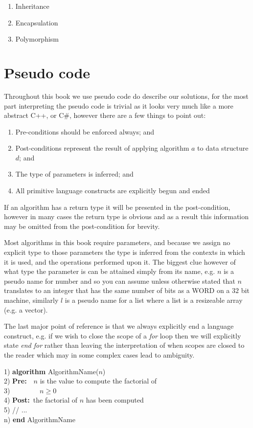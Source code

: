 \begin{enumerate}
\item Inheritance
\item Encapsulation
\item Polymorphism
\end{enumerate}

\section{Pseudo code}
Throughout this book we use pseudo code do describe our solutions, for the most part interpreting the pseudo code is trivial as it looks very much like a more abstract C++, or C\#, however there are a few things to point out:

\begin{enumerate}
\item Pre-conditions should be enforced always; and
\item Post-conditions represent the result of applying algorithm $a$ to data structure $d$; and
\item The type of parameters is inferred; and
\item All primitive language constructs are explicitly begun and ended
\end{enumerate}

If an algorithm has a return type it will be presented in the post-condition, however in many cases the return type is obvious and as a result this information may be omitted from the post-condition for brevity.

Most algorithms in this book require parameters, and because we assign no explicit type to those parameters the type is inferred from the contexts in which it is used, and the operations performed upon it. The biggest clue however of what type the parameter is can be attained simply from its name, e.g. $n$ is a pseudo name for number and so you can assume unless otherwise stated that $n$ translates to an integer that has the same number of bits as a WORD on a $32$ bit machine, similarly $l$ is a pseudo name for a list where a list is a resizeable array (e.g. a vector).

The last major point of reference is that we always explicitly end a language construct, e.g. if we wish to close the scope of a \textit{for} loop then we will explicitly state \textit{end for} rather than leaving the interpretation of when scopes are closed to the reader which may in some complex cases lead to ambiguity.

\begin{tabbing}
1)  \textbf{alg}\= \textbf{orithm} AlgorithmName($n$) \\
2)  \> \textbf{Pre:}~~$n$ is the value to compute the factorial of \\
3)  \> ~~~~~~~~$n \geq 0$ \\
4)  \> \textbf{Post:}~the factorial of $n$ has been computed \\
5)  \> // ... \\
n) \textbf{end} AlgorithmName \\
\end{tabbing}

